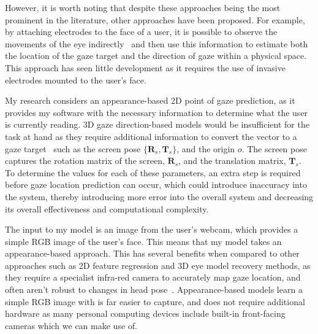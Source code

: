 \documentclass[twocolumn]{report}
\begin{document}
However, it is worth noting that despite these approaches being the most prominent in the literature, other approaches have been proposed. For example, by attaching electrodes to the face of a user, it is possible to observe the movements of the eye indirectly~\cite{young1975survey} and then use this information to estimate both the location of the gaze target and the direction of gaze within a physical space. This approach has seen little development as it requires the use of invasive electrodes mounted to the user's face. 

My research considers an appearance-based 2D point of gaze prediction, as it provides my software with the necessary information to determine what the user is currently reading. 3D gaze direction-based models would be insufficient for the task at hand as they require additional information to convert the vector to a gaze target~\cite{cheng2021survey} such as the screen pose \(\{\pmb R_s, \pmb T_s\}\), and the origin \(o\). The screen pose captures the rotation matrix of the screen, \(\pmb R_s\), and the translation matrix, \(\pmb T_s\). To determine the values for each of these parameters, an extra step is required before gaze location prediction can occur, which could introduce inaccuracy into the system, thereby introducing more error into the overall system and decreasing its overall effectiveness and computational complexity. 

The input to my model is an image from the user's webcam, which provides a simple RGB image of the user's face. This means that my model takes an appearance-based approach. This has several benefits when compared to other approaches such as 2D feature regression and 3D eye model recovery methods, as they require a specialist infra-red camera to accurately map gaze location, and often aren't robust to changes in head pose~\cite{zhu2006nonlinear}. Appearance-based models learn a simple RGB image with is far easier to capture, and does not require additional hardware as many personal computing devices include built-in front-facing cameras which we can make use of. 


\end{document}
